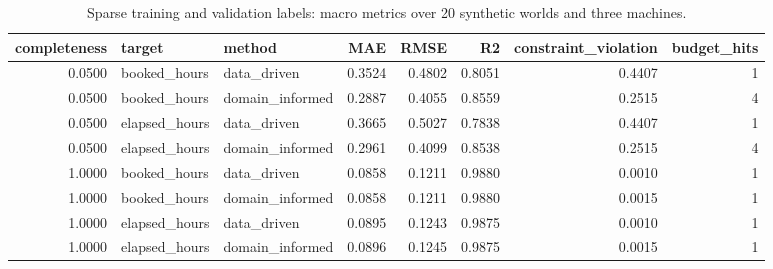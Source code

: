\begin{table}
\caption{Sparse training and validation labels: macro metrics over 20 synthetic worlds and three machines.}
\begin{tabular}{rllrrrrr}
\toprule
completeness & target & method & MAE & RMSE & R2 & constraint_violation & budget_hits \\
\midrule
0.0500 & booked_hours & data_driven & 0.3524 & 0.4802 & 0.8051 & 0.4407 & 1 \\
0.0500 & booked_hours & domain_informed & 0.2887 & 0.4055 & 0.8559 & 0.2515 & 4 \\
0.0500 & elapsed_hours & data_driven & 0.3665 & 0.5027 & 0.7838 & 0.4407 & 1 \\
0.0500 & elapsed_hours & domain_informed & 0.2961 & 0.4099 & 0.8538 & 0.2515 & 4 \\
1.0000 & booked_hours & data_driven & 0.0858 & 0.1211 & 0.9880 & 0.0010 & 1 \\
1.0000 & booked_hours & domain_informed & 0.0858 & 0.1211 & 0.9880 & 0.0015 & 1 \\
1.0000 & elapsed_hours & data_driven & 0.0895 & 0.1243 & 0.9875 & 0.0010 & 1 \\
1.0000 & elapsed_hours & domain_informed & 0.0896 & 0.1245 & 0.9875 & 0.0015 & 1 \\
\bottomrule
\end{tabular}
\end{table}
